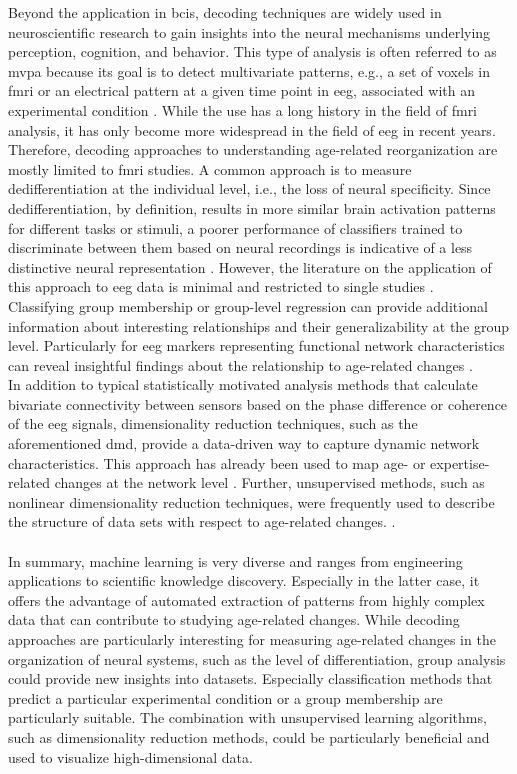 Beyond the application in \glspl{bci}, decoding techniques are widely used in neuroscientific research to gain insights into the neural mechanisms underlying perception, cognition, and behavior. This type of analysis is often referred to as \gls{mvpa} because its goal is to detect multivariate patterns, e.g., a set of voxels in \gls{fmri} or an electrical pattern at a given time point in \gls{eeg}, associated with an experimental condition \cite{Holdgraf2017}. While the use has a long history in the field of \gls{fmri} analysis, it has only become more widespread in the field of \gls{eeg} in recent years. Therefore, decoding approaches to understanding age-related reorganization are mostly limited to \gls{fmri} studies. A common approach is to measure dedifferentiation at the individual level, i.e., the loss of neural specificity. Since dedifferentiation, by definition, results in more similar brain activation patterns for different tasks or stimuli, a poorer performance of classifiers trained to discriminate between them based on neural recordings is indicative of a less distinctive neural representation \cite{Koen2019, Park2010}. However, the literature on the application of this approach to \gls{eeg} data is minimal and restricted to single studies \cite{Chen2019}.\\
Classifying group membership or group-level regression can provide additional information about interesting relationships and their generalizability at the group level. Particularly for \gls{eeg} markers representing functional network characteristics can reveal insightful findings about the relationship to age-related changes \cite{Petti2016}.\\
In addition to typical statistically motivated analysis methods that calculate bivariate connectivity between sensors based on the phase difference or coherence of the \gls{eeg} signals, dimensionality reduction techniques, such as the aforementioned \gls{dmd}, provide a data-driven way to capture dynamic network characteristics. This approach has already been used to map age- or expertise-related changes at the network level \cite{Vieluf2018}. Further, unsupervised methods, such as nonlinear dimensionality reduction techniques, were frequently used to describe the structure of data sets with respect to age-related changes.  \cite{Banville2021,Kottlarz2020}.\\
\\
In summary, machine learning is very diverse and ranges from engineering applications to scientific knowledge discovery. Especially in the latter case, it offers the advantage of automated extraction of patterns from highly complex data that can contribute to studying age-related changes. While decoding approaches are particularly interesting for measuring age-related changes in the organization of neural systems, such as the level of differentiation, group analysis could provide new insights into datasets. Especially classification methods that predict a particular experimental condition or a group membership are particularly suitable. The combination with unsupervised learning algorithms, such as dimensionality reduction methods, could be particularly beneficial and used to visualize high-dimensional data.



